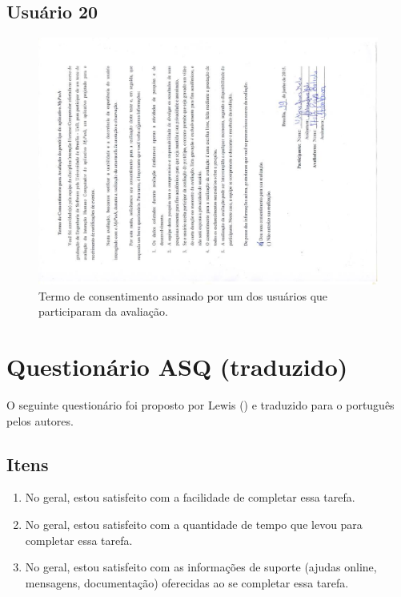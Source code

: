 \begin{anexosenv}
    \section*{Usuário 20}
    \begin{figure}[!htbp]
      \centering
      \includegraphics[scale=0.6, angle=-90]{editaveis/figuras/matheus_alves}
      \caption{Termo de consentimento assinado por um dos usuários que participaram da avaliação.}
      \label{termo_consentimento_1}
    \end{figure}

	
	
  \chapter{Questionário ASQ (traduzido)}
      
      O seguinte questionário foi proposto por Lewis (\citeyear{lewis91}) e traduzido para o português pelos autores.
      
      \section*{Itens}
	
	\begin{enumerate}
	  \item No geral, estou satisfeito com a facilidade de completar essa tarefa.
	  \item No geral, estou satisfeito com a quantidade de tempo que levou para completar essa tarefa.
	  \item No geral, estou satisfeito com as informações de suporte (ajudas online, mensagens, documentação)
	    oferecidas ao se completar essa tarefa.
	\end{enumerate}
      

\end{anexosenv}
